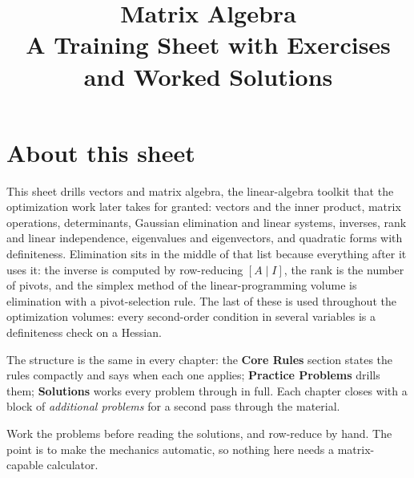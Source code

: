\documentclass[10pt,oneside]{book}
\title{\Huge Matrix Algebra\\[0.4em]
  \large A Training Sheet with Exercises and Worked Solutions}
\author{}
\date{}
\begin{document}
\frontmatter
\maketitle

\chapter*{About this sheet}

This sheet drills vectors and matrix algebra, the linear-algebra toolkit
that the optimization work later takes for granted: vectors and the inner
product, matrix operations, determinants, Gaussian elimination and linear
systems, inverses, rank and linear independence, eigenvalues and
eigenvectors, and quadratic forms with definiteness. Elimination sits in the
middle of that list because everything after it uses it: the inverse is
computed by row-reducing $[A\mid I]$, the rank is the number of pivots, and
the simplex method of the linear-programming volume is elimination with a
pivot-selection rule. The last of these is used throughout the optimization
volumes: every second-order condition in several variables is a definiteness
check on a Hessian.

The structure is the same in every chapter: the \textbf{Core Rules} section
states the rules compactly and says when each one applies; \textbf{Practice
Problems} drills them; \textbf{Solutions} works every problem through in
full. Each chapter closes with a block of \emph{additional problems} for a
second pass through the material.

Work the problems before reading the solutions, and row-reduce by hand. The
point is to make the mechanics automatic, so nothing here needs a
matrix-capable calculator.

\tableofcontents

\mainmatter










\end{document}
